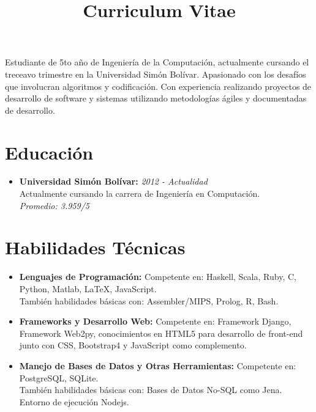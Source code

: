 \documentclass[11pt,a4paper,sans,unicode]{moderncv}
\title{Curriculum Vitae}
\begin{document}
\makecvtitle

\small{Estudiante de 5to año de Ingeniería de la Computación, actualmente cursando el treceavo trimestre en la Universidad Simón Bolívar. Apasionado con los desafíos que involucran algoritmos y codificación. Con experiencia realizando proyectos de desarrollo de software y sistemas utilizando metodologías ágiles y documentadas de desarrollo.}

\section{Educación}
\begin{itemize}
\vspace{2pt}
\item \textbf{Universidad Simón Bolívar:} \emph{2012 - Actualidad} \\ Actualmente cursando la carrera de Ingeniería en Computación. \\ \emph{Promedio: 3.959/5} 
\vspace{2pt}
\end{itemize}

\section{Habilidades Técnicas}

\vspace{2pt}

\begin{itemize}

\item \textbf{Lenguajes de Programación:} Competente en: Haskell, Scala, Ruby, C, Python, Matlab, \LaTeX, JavaScript. \\ También habilidades básicas con: Assembler/MIPS, Prolog, R, Bash.

\vspace{2pt}

\item \textbf{Frameworks y Desarrollo Web:} Competente en: Framework Django, Framework Web2py, conocimientos en HTML5 para desarrollo de front-end junto con CSS, Bootstrap4 y JavaScript como complemento.  

\vspace{2pt}

\item \textbf{Manejo de Bases de Datos y Otras Herramientas:} Competente en: PostgreSQL, SQLite. \\ También habilidades básicas con: Bases de Datos No-SQL como Jena. Entorno de ejecución Nodejs.

\end{itemize}
\end{document}
